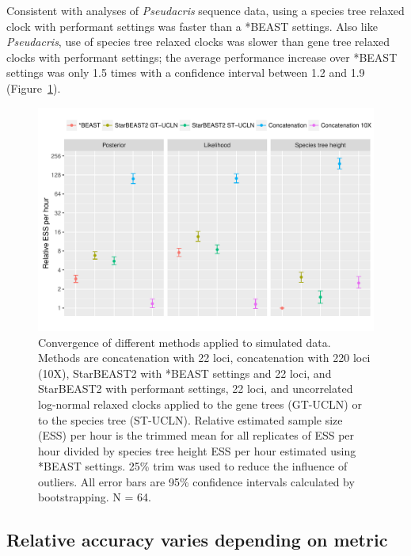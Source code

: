 \documentclass[12pt]{article}
\begin{document}
Consistent with analyses of \textit{Pseudacris} sequence data, using a species
tree relaxed clock with performant settings was faster than a *BEAST settings.
Also like \textit{Pseudacris}, use of species tree relaxed clocks was slower than
gene tree relaxed clocks with performant settings; the average performance
increase over *BEAST settings was only 1.5 times with a confidence interval
between 1.2 and 1.9 (Figure~\ref{fig:simulatedEssPerHour}).

\begin{figure}[htb!]
\centering
\includegraphics[width=16cm]{multiple_ess_per_hour.pdf}
\caption
{Convergence of different methods applied to simulated data. Methods are
concatenation with 22 loci, concatenation with 220 loci (10X), StarBEAST2 with
*BEAST settings and 22 loci, and StarBEAST2 with performant settings, 22 loci,
and uncorrelated log-normal relaxed clocks applied to the gene trees (GT-UCLN) or
to the species tree (ST-UCLN). Relative estimated sample size (ESS) per hour is the trimmed mean for all replicates of
ESS per hour divided by species tree height ESS per hour estimated using *BEAST
settings. 25\% trim was used to reduce the influence of
outliers. All error bars are 95\% confidence intervals calculated by
bootstrapping. N = 64.}
\label{fig:simulatedEssPerHour}
\end{figure}

\subsection*{Relative accuracy varies depending on metric}
\end{document}
